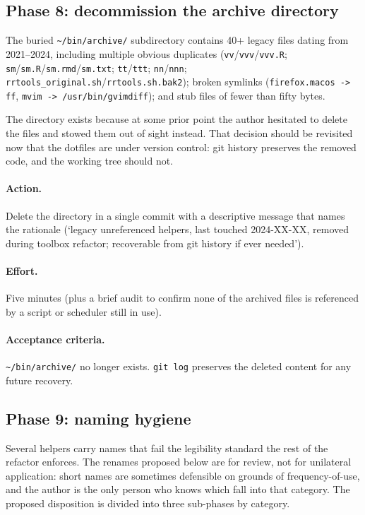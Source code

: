 \documentclass[11pt,letterpaper]{scrartcl}
\begin{document}
\subsection{Phase 8: decommission the archive directory}

The buried \texttt{\textasciitilde/bin/archive/} subdirectory
contains 40+ legacy files dating from 2021--2024, including
multiple obvious duplicates (\texttt{vv}/\texttt{vvv}/\texttt{vvv.R};
\texttt{sm}/\texttt{sm.R}/\texttt{sm.rmd}/\texttt{sm.txt};
\texttt{tt}/\texttt{ttt}; \texttt{nn}/\texttt{nnn};
\texttt{rrtools\_original.sh}/\texttt{rrtools.sh.bak2}); broken
symlinks (\texttt{firefox.macos -> ff},
\texttt{mvim -> /usr/bin/gvimdiff}); and stub files of fewer than
fifty bytes.

The directory exists because at some prior point the author
hesitated to delete the files and stowed them out of sight
instead. That decision should be revisited now that the dotfiles
are under version control: git history preserves the removed
code, and the working tree should not.

\paragraph{Action.} Delete the directory in a single commit with
a descriptive message that names the rationale (`legacy
unreferenced helpers, last touched 2024-XX-XX, removed during
toolbox refactor; recoverable from git history if ever needed').

\paragraph{Effort.} Five minutes (plus a brief audit to confirm
none of the archived files is referenced by a script or
scheduler still in use).

\paragraph{Acceptance criteria.} \texttt{\textasciitilde/bin/archive/}
no longer exists. \texttt{git log} preserves the deleted
content for any future recovery.

\subsection{Phase 9: naming hygiene}

Several helpers carry names that fail the legibility standard the
rest of the refactor enforces. The renames proposed below are for
review, not for unilateral application: short names are sometimes
defensible on grounds of frequency-of-use, and the author is the
only person who knows which fall into that category. The proposed
disposition is divided into three sub-phases by category.
\end{document}
